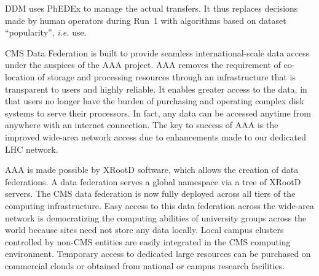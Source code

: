 \documentclass[11pt,a4paper]{article}
\begin{document}
DDM uses PhEDEx to manage the actual transfers. It thus replaces decisions
made by human operators during Run~1 with algorithms based on dataset
``popularity'', {\it i.e.} use.


CMS Data Federation is built to provide seamless international-scale data
access under the auspices of the AAA project. AAA removes the requirement
of co-location of storage and processing resources through an
infrastructure that is transparent to users and highly reliable.  It
enables greater access to the data, in that users no longer have the burden
of purchasing and operating complex disk systems to serve their
processors. In fact, any data can be accessed anytime from anywhere with an
internet connection. The key to success of AAA is the improved wide-area
network access due to enhancements made to our dedicated LHC network.

AAA is made possible by XRootD software, which allows the creation of
data federations. A data federation serves a global namespace via a
tree of XRootD servers. 
The CMS data federation is now fully deployed across all tiers of the
computing infrastructure. Easy access to this data federation across the
wide-area network is democratizing the computing abilities of university
groups across the world because sites need not store any data
locally. Local campus clusters controlled by non-CMS entities are easily
integrated in the CMS computing environment. Temporary access to dedicated
large resources can be purchased on commercial clouds or obtained from
national or campus research facilities.
\end{document}
